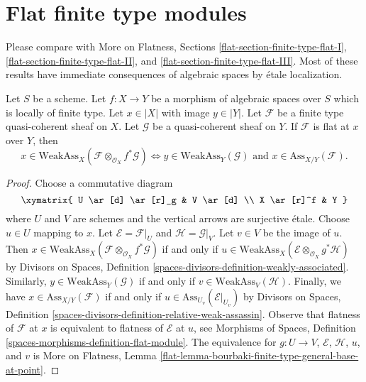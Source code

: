 \section{Flat finite type modules}
\label{section-finite-type-flat}

\noindent
Please compare with
More on Flatness, Sections
\ref{flat-section-finite-type-flat-I},
\ref{flat-section-finite-type-flat-II}, and
\ref{flat-section-finite-type-flat-III}.
Most of these results have immediate consequences
of algebraic spaces by \'etale localization.

\begin{lemma}
\label{lemma-bourbaki-finite-type-general-base-at-point}
Let $S$ be a scheme.
Let $f : X \to Y$ be a morphism of algebraic spaces over $S$ which is
locally of finite type. Let $x \in |X|$ with image $y \in |Y|$.
Let $\mathcal{F}$ be a finite type quasi-coherent sheaf on $X$.
Let $\mathcal{G}$ be a quasi-coherent sheaf on $Y$.
If $\mathcal{F}$ is flat at $x$ over $Y$, then
$$
x \in \text{WeakAss}_X(\mathcal{F} \otimes_{\mathcal{O}_X} f^*\mathcal{G})
\Leftrightarrow
y \in \text{WeakAss}_Y(\mathcal{G})
\text{ and }
x \in \text{Ass}_{X/Y}(\mathcal{F}).
$$
\end{lemma}

\begin{proof}
Choose a commutative diagram
$$
\xymatrix{
U \ar[d] \ar[r]_g & V \ar[d] \\
X \ar[r]^f & Y
}
$$
where $U$ and $V$ are schemes and the vertical arrows are surjective \'etale.
Choose $u \in U$ mapping to $x$. Let $\mathcal{E} = \mathcal{F}|_U$
and $\mathcal{H} = \mathcal{G}|_V$.
Let $v \in V$ be the image of $u$. Then
$x \in \text{WeakAss}_X(\mathcal{F} \otimes_{\mathcal{O}_X} f^*\mathcal{G})$
if and only if
$u \in \text{WeakAss}_X(\mathcal{E} \otimes_{\mathcal{O}_X} g^*\mathcal{H})$
by Divisors on Spaces, Definition
\ref{spaces-divisors-definition-weakly-associated}.
Similarly, $y \in \text{WeakAss}_Y(\mathcal{G})$ if and only if
$v \in \text{WeakAss}_V(\mathcal{H})$.
Finally, we have $x \in \text{Ass}_{X/Y}(\mathcal{F})$ if and only if
$u \in \text{Ass}_{U_v}(\mathcal{E}|_{U_v})$ by
Divisors on Spaces, Definition
\ref{spaces-divisors-definition-relative-weak-assassin}.
Observe that flatness of $\mathcal{F}$ at $x$ is
equivalent to flatness of $\mathcal{E}$ at $u$, see
Morphisms of Spaces, Definition \ref{spaces-morphisms-definition-flat-module}.
The equivalence for $g : U \to V$, $\mathcal{E}$, $\mathcal{H}$, $u$, and $v$
is More on Flatness, Lemma
\ref{flat-lemma-bourbaki-finite-type-general-base-at-point}.
\end{proof}

